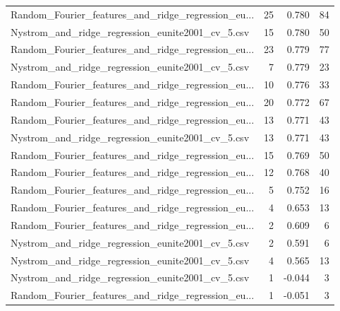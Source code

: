 \begin{tabularx}{\textwidth}{lrrr}
Random\_Fourier\_features\_and\_ridge\_regression\_eu... &       25 &               0.780 &            84 \\
  Nystrom\_and\_ridge\_regression\_eunite2001\_cv\_5.csv &       15 &               0.780 &            50 \\
Random\_Fourier\_features\_and\_ridge\_regression\_eu... &       23 &               0.779 &            77 \\
  Nystrom\_and\_ridge\_regression\_eunite2001\_cv\_5.csv &        7 &               0.779 &            23 \\
Random\_Fourier\_features\_and\_ridge\_regression\_eu... &       10 &               0.776 &            33 \\
Random\_Fourier\_features\_and\_ridge\_regression\_eu... &       20 &               0.772 &            67 \\
Random\_Fourier\_features\_and\_ridge\_regression\_eu... &       13 &               0.771 &            43 \\
  Nystrom\_and\_ridge\_regression\_eunite2001\_cv\_5.csv &       13 &               0.771 &            43 \\
Random\_Fourier\_features\_and\_ridge\_regression\_eu... &       15 &               0.769 &            50 \\
Random\_Fourier\_features\_and\_ridge\_regression\_eu... &       12 &               0.768 &            40 \\
Random\_Fourier\_features\_and\_ridge\_regression\_eu... &        5 &               0.752 &            16 \\
Random\_Fourier\_features\_and\_ridge\_regression\_eu... &        4 &               0.653 &            13 \\
Random\_Fourier\_features\_and\_ridge\_regression\_eu... &        2 &               0.609 &             6 \\
  Nystrom\_and\_ridge\_regression\_eunite2001\_cv\_5.csv &        2 &               0.591 &             6 \\
  Nystrom\_and\_ridge\_regression\_eunite2001\_cv\_5.csv &        4 &               0.565 &            13 \\
  Nystrom\_and\_ridge\_regression\_eunite2001\_cv\_5.csv &        1 &              -0.044 &             3 \\
Random\_Fourier\_features\_and\_ridge\_regression\_eu... &        1 &              -0.051 &             3 \\
\bottomrule
\end{tabularx}
